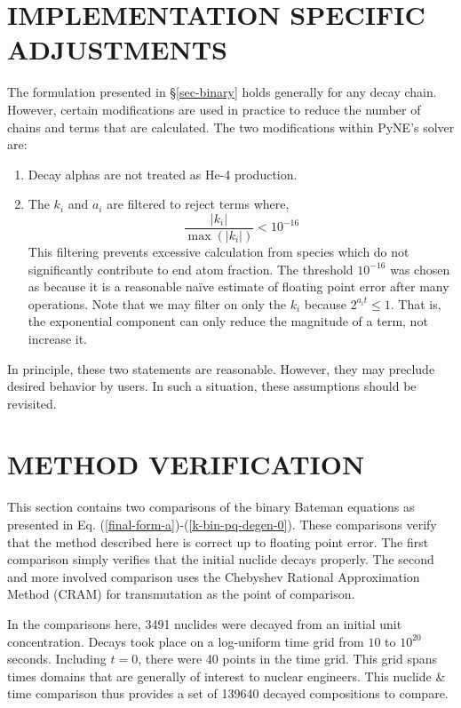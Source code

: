 \documentclass[letterpaper]{physor2018}
\begin{document}
\section{IMPLEMENTATION SPECIFIC ADJUSTMENTS}
\label{sec-impl-spec-approx}
The formulation presented in \S\ref{sec-binary} holds generally for any decay chain.
However, certain modifications are used in practice to reduce the number of chains and terms
that are calculated. The two modifications within PyNE's solver are:
\begin{enumerate}
\item Decay alphas are not treated as He-4 production.
\item The $k_i$ and $a_i$ are filtered to reject terms where,
   \begin{equation}
   \label{filter-cond}
   \frac{|k_i|}{\max(|k_i|)} < 10^{-16}
   \end{equation}
   This filtering prevents excessive
   calculation from species which do not significantly contribute to
   end atom fraction. The threshold $10^{-16}$ was chosen as
   because it is a reasonable na\"ive estimate of floating point error after
   many operations. Note that we may filter on only the $k_i$ because
   $2^{a_i t} \le 1$.  That is, the exponential component can only
   reduce the magnitude of a term, not increase it.
\end{enumerate}
In principle, these two statements are reasonable. However, they
may preclude desired behavior by users. In such a situation, these
assumptions should be revisited.


\section{METHOD VERIFICATION}
\label{sec-verify}
This section contains two comparisons of the binary Bateman equations
as presented in Eq. (\ref{final-form-a})-(\ref{k-bin-pq-degen-0}). These
comparisons verify that the method described here is correct up to
floating point error. The first comparison simply verifies that the
initial nuclide decays properly. The second and more involved comparison
uses the Chebyshev Rational Approximation Method (CRAM)
for transmutation \cite{pusa2010computing,pusa2012correction} as the point
of comparison.

In the comparisons here, 3491 nuclides were decayed from an initial unit
concentration. Decays took place on a log-uniform time grid from $10$ to $10^{20}$
seconds. Including $t=0$, there were 40 points in the time grid. This grid
spans times domains that are generally of interest to nuclear
engineers. This nuclide \& time comparison thus provides a set of 139640
decayed compositions to compare.
\end{document}

